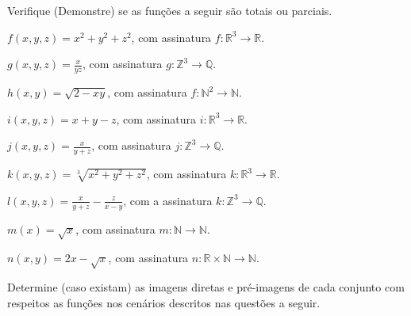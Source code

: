 \begin{questao}\label{prob:Funcao4}
	Verifique (Demonstre) se as funções a seguir são totais ou parciais.
\end{questao}

\begin{exerList}
	\item $f(x, y, z) = x^2 + y^2 + z^2$, com assinatura $f : \mathbb{R}^3 \rightarrow \mathbb{R}$.
	\item $g(x, y, z) = \displaystyle\frac{x}{yz}$, com assinatura $g : \mathbb{Z}^3 \rightarrow \mathbb{Q}$.
	\item $h(x, y) = \sqrt{2 - xy}$, com assinatura $f : \mathbb{N}^2 \rightarrow \mathbb{N}$.
	\item $i(x, y, z) = x + y - z$, com assinatura $i: \mathbb{R}^3 \rightarrow \mathbb{R}$.
	\item $j(x, y, z) = \frac{x}{y+z}$, com assinatura $j : \mathbb{Z}^3 \rightarrow \mathbb{Q}$.
	\item $k(x, y, z) = \sqrt[3]{x^2 + y^2 + z^2}$, com assinatura $k :  \mathbb{R}^3 \rightarrow \mathbb{R}$.
	\item $l(x, y, z) = \displaystyle\frac{x}{y+z} - \frac{z}{x-y}$, com a assinatura $k :  \mathbb{Z}^3 \rightarrow \mathbb{Q}$.
	\item $m(x) = \sqrt{x}$, com assinatura $m: \mathbb{N} \rightarrow \mathbb{N}$.
	\item $n(x, y) = 2x - \sqrt{x}$, com assinatura $n: \mathbb{R} \times \mathbb{N} \rightarrow \mathbb{N}$. 
\end{exerList}

\begin{questao}\label{prob:Funcao5}
  Determine (caso existam) as imagens diretas e pré-imagens de cada conjunto com respeitos as funções nos cenários descritos nas questões a seguir.
\end{questao}


